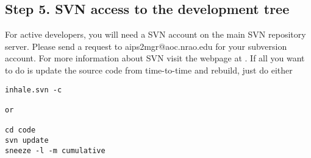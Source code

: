 \subsection*{Step 5. SVN access to the development tree}

For active developers, you will need a SVN account on the main SVN repository server.
Please send a request to aips2mgr@aoc.nrao.edu for your subversion account. For more information
about SVN visit the webpage at .
If all you want to do is update the source code from time-to-time and rebuild, just do either
\begin{verbatim}
inhale.svn -c

or

cd code
svn update
sneeze -l -m cumulative
\end{verbatim}
